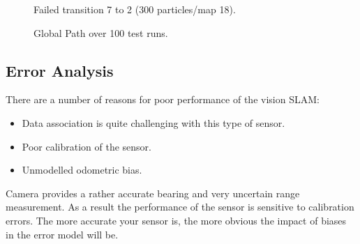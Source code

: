 \begin{figure}[htbp]
  \centering

  \caption{Failed transition 7 to 2 (300 particles/map
    18).}
  \label{fig:edge_map_300p_borken2}
\end{figure}

\begin{figure}[htbp]
  \centering
  \caption{Global Path over 100 test runs.}
  \label{fig:edge_odo_all}
\end{figure}



\subsection{Error Analysis}

There are a number of reasons for poor performance of the vision
SLAM:

\begin{itemize}
\item Data association is quite challenging with this type of
sensor. 
\item Poor calibration of the sensor.
\item Unmodelled odometric bias.
\end{itemize}

Camera provides a rather accurate bearing and very uncertain range
measurement. As a result the performance of the sensor is sensitive to
calibration errors. The more accurate your sensor is, the more obvious
the impact of biases in the error model will be.

